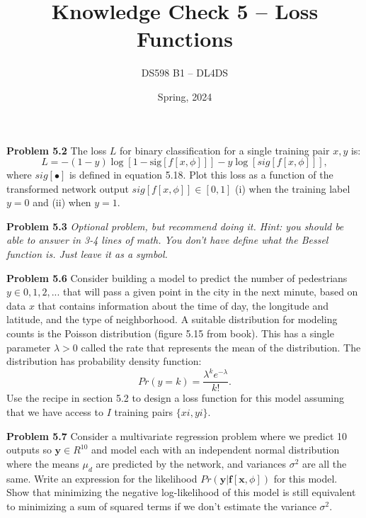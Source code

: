 \documentclass[11pt, oneside]{article}   	%
\title{Knowledge Check 5 -- Loss Functions}
\author{DS598 B1 -- DL4DS}
\date{Spring, 2024}							%
\begin{document}
\maketitle

\textbf{Problem 5.2} The loss \(L\) for binary classification for a single
training pair \({x, y}\) is:
\[L = -(1 - y) \log [1 - \mathrm{sig}[f[x,\phi]]] - y \log [sig[f[x,\phi]]] ,\]
where \(sig[\bullet]\) is defined in equation 5.18. Plot this loss as a function
of the transformed network output \(sig[f[x,\phi]] \in [0, 1]\) 
(i) when the training label \(y = 0\) and (ii) when \(y = 1\).

\vspace{1cm}

\textbf{Problem 5.3} \textit{Optional problem, but recommend doing it. Hint: you
should be able to answer in 3-4 lines of math. You don't have define what the
Bessel function is. Just leave it as a symbol.}

\vspace{1cm}

\textbf{Problem 5.6} Consider building a model to predict the number of
pedestrians \(y \in {0, 1, 2, . . .}\)
that will pass a given point in the city in the next minute, based on data \(x\)
that contains information about the time of day, the longitude and latitude, and
the type of neighborhood. A suitable distribution for modeling counts is the
Poisson distribution (figure 5.15 from book). This has a single parameter
\(\lambda > 0\) called the rate that represents the mean of the distribution.
The distribution has probability density function:
\[Pr(y = k) = \frac{\lambda^k e^{-\lambda}}{ k!}. \]
Use the recipe in section 5.2 to design a loss function for this model assuming
that we have access to \(I\) training pairs \(\{xi, yi\}\).

\vspace{1cm}

\textbf{Problem 5.7} Consider a multivariate regression problem where we predict
10 outputs so \(\mathbf{y} \in R^{10}\) and model each with an independent normal
distribution where the means \(\mu_d\) are predicted
by the network, and variances \(\sigma^2\) are all the same. Write an expression
for the likelihood \(Pr(\mathbf{y}|\mathbf{f}[\mathbf{x},\phi])\) for this
model. Show that minimizing the
negative log-likelihood of this model is still equivalent to minimizing a sum of
squared terms if we don't estimate the variance \(\sigma^2\).
\end{document}
